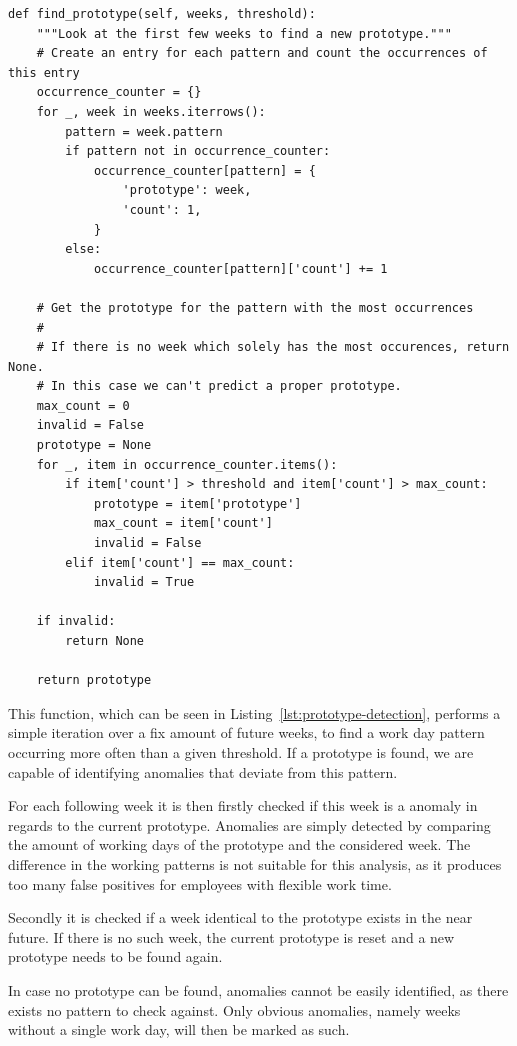 \begin{verbatim}
def find_prototype(self, weeks, threshold):
    """Look at the first few weeks to find a new prototype."""
    # Create an entry for each pattern and count the occurrences of this entry
    occurrence_counter = {}
    for _, week in weeks.iterrows():
        pattern = week.pattern
        if pattern not in occurrence_counter:
            occurrence_counter[pattern] = {
                'prototype': week,
                'count': 1,
            }
        else:
            occurrence_counter[pattern]['count'] += 1

    # Get the prototype for the pattern with the most occurrences
    #
    # If there is no week which solely has the most occurences, return None.
    # In this case we can't predict a proper prototype.
    max_count = 0
    invalid = False
    prototype = None
    for _, item in occurrence_counter.items():
        if item['count'] > threshold and item['count'] > max_count:
            prototype = item['prototype']
            max_count = item['count']
            invalid = False
        elif item['count'] == max_count:
            invalid = True

    if invalid:
        return None

    return prototype
\end{verbatim}
\begingroup
{}\label{lst:prototype-detection}
\endgroup

This function, which can be seen in Listing~\ref{lst:prototype-detection}, performs a simple iteration over a fix amount of future weeks, to find a work day pattern occurring more often than a given threshold.
If a prototype is found, we are capable of identifying anomalies that deviate from this pattern.

For each following week it is then firstly checked if this week is a anomaly in regards to the current prototype.
Anomalies are simply detected by comparing the amount of working days of the prototype and the considered week.
The difference in the working patterns is not suitable for this analysis, as it produces too many false positives for employees with flexible work time.

Secondly it is checked if a week identical to the prototype exists in the near future.
If there is no such week, the current prototype is reset and a new prototype needs to be found again.

In case no prototype can be found, anomalies cannot be easily identified, as there exists no pattern to check against.
Only obvious anomalies, namely weeks without a single work day, will then be marked as such.
